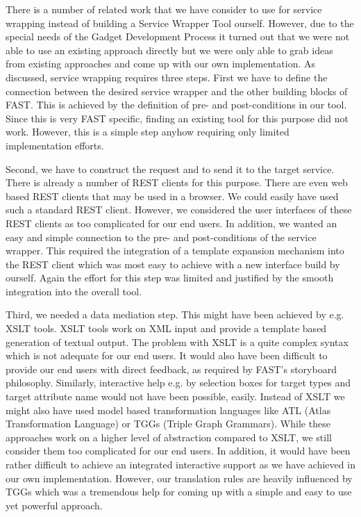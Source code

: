\documentclass{fast_latex}
\begin{document}
There is a number of related work that we have consider to use for service wrapping instead of building a Service Wrapper
Tool ourself. However, due to the special needs of the Gadget Development Process it turned out that we were not able 
to use an existing approach directly but we were only able to grab ideas from existing approaches and come up with our own implementation. 
As discussed, service wrapping requires three steps. First we have to define the connection between the desired service wrapper and the other building blocks of FAST. This is achieved by the definition of pre- and post-conditions in our tool. Since this is very FAST specific, finding an existing tool for this purpose did not work. However, this is a simple step anyhow requiring only limited implementation efforts. 

Second, we have to construct the request and to send it to the target service. There is already a number of REST clients 
for this purpose. There are even web based REST clients that may be used in a browser. We could easily have used such 
a standard REST client. However, we considered the user interfaces of these REST clients as too complicated for our
end users. In addition, we wanted an easy and simple connection to the pre- and post-conditions of the service wrapper. 
This required the integration of a template expansion mechanism into the REST client which was most easy to achieve 
with a new interface build by ourself. Again the effort for this step was limited and justified by the smooth integration into the overall tool. 

Third, we needed a data mediation step. This might have been achieved by e.g. XSLT tools. XSLT tools work on 
XML input and provide a template based generation of textual output. The problem with XSLT is a quite 
complex syntax which is not adequate for our end users. It would also have been difficult to provide our end users with direct feedback, as required by FAST's storyboard philosophy. Similarly, interactive help e.g. by selection boxes for target types and target attribute name would not have been possible, easily. Instead of XSLT we might also have used model based transformation languages like ATL (Atlas Transformation Language) or TGGs (Triple Graph Grammars). While these approaches work on a higher level of abstraction compared to XSLT, we still consider them too complicated for our end users. 
In addition, it would have been rather difficult to achieve an integrated interactive support as we have achieved in our 
own implementation. However, our translation rules are heavily influenced by TGGs which was a tremendous help 
for coming up with a simple and easy to use yet powerful approach. 
\end{document}
